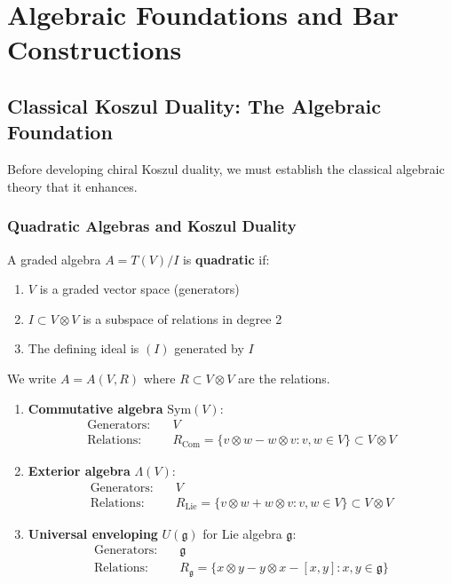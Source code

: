 \chapter{Algebraic Foundations and Bar Constructions}

\section{Classical Koszul Duality: The Algebraic Foundation}
\label{sec:classical-koszul-foundation}

Before developing chiral Koszul duality, we must establish the classical algebraic theory that it enhances.

\subsection{Quadratic Algebras and Koszul Duality}

\begin{definition}
\label{def:quadratic-algebra}
A graded algebra $A = T(V)/I$ is \textbf{quadratic} if:
\begin{enumerate}
\item $V$ is a graded vector space (generators)
\item $I \subset V \otimes V$ is a subspace of relations in degree 2
\item The defining ideal is $(I)$ generated by $I$
\end{enumerate}
We write $A = A(V, R)$ where $R \subset V \otimes V$ are the relations.
\end{definition}

\begin{example}
\label{ex:classical-quadratic-algebras}
\begin{enumerate}
\item \textbf{Commutative algebra} $\text{Sym}(V)$:
\begin{align}
\text{Generators:} &\quad V \\
\text{Relations:} &\quad R_{\text{Com}} = \{v \otimes w - w \otimes v : v,w \in V\} \subset V \otimes V
\end{align}

\item \textbf{Exterior algebra} $\Lambda(V)$:
\begin{align}
\text{Generators:} &\quad V \\
\text{Relations:} &\quad R_{\text{Lie}} = \{v \otimes w + w \otimes v : v,w \in V\} \subset V \otimes V
\end{align}

\item \textbf{Universal enveloping} $U(\mathfrak{g})$ for Lie algebra $\mathfrak{g}$:
\begin{align}
\text{Generators:} &\quad \mathfrak{g} \\
\text{Relations:} &\quad R_{\mathfrak{g}} = \{x \otimes y - y \otimes x - [x,y] : x,y \in \mathfrak{g}\}
\end{align}
\end{enumerate}
\end{example}

